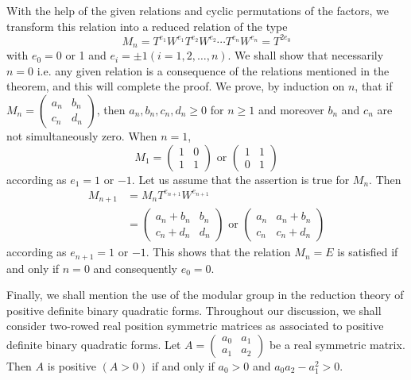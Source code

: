With the help of the given relations and cyclic permutations of the
factors, we transform this relation into a reduced relation of the
type
$$
M_n = T^{e_1} W^{e_1} T^{e_2} W^{e_2} \cdots T^{e_n} W^{e_n} = T^{2e_0}
$$
with $e_0=0$ or 1 and $e_i=\pm 1 (i=1,2,\ldots, n)$. We shall show
that necessarily $n=0$ i.e. any given relation is a consequence of the
relations mentioned in the theorem, and this will complete the
proof. We prove, by induction on $n$, that if $M_n = \left(\begin{smallmatrix}
a_n &b_n\\c_n& d_n
\end{smallmatrix}\right)$, then $a_n, b_n, c_n, d_n \geq 0$ for $n\geq
1$ and moreover $b_n$ and $c_n$ are not simultaneously zero. When
$n=1$, 
$$
M_1 = \begin{pmatrix}
1&0\\1&1
\end{pmatrix} \text{ or } \begin{pmatrix}
1&1\\0&1
\end{pmatrix}
$$
according as $e_1=1$ or $-1$. Let us assume that the assertion is true
for $M_n$. \pageoriginale Then
\begin{align*}
M_{n+1} & = M_n T^{e_{n+1}} W^{e_{n+1}}\\
& = \begin{pmatrix}
a_n+b_n & b_n\\
c_n +d_n & d_n
\end{pmatrix} \text{ or } \begin{pmatrix}
a_n & a_n + b_n\\
c_n & c_n + d_n
\end{pmatrix}
\end{align*}
according as $e_{n+1}=1$ or $-1$. This shows that the relation $M_n=E$
is satisfied if and only if $n=0$ and consequently $e_0=0$.

Finally, we shall mention the use of the modular group in the
reduction theory of positive definite binary quadratic
forms. Throughout our discussion, we shall consider two-rowed real
position symmetric matrices as associated to positive definite binary
quadratic forms. Let
$A=\left(\begin{smallmatrix}a_0&a_1\\a_1&a_2 \end{smallmatrix}\right)$
be a real symmetric matrix. Then $A$ is positive $(A>0)$ if and only
if $a_0>0$ and $a_0a_2 - a^2_1>0$.

